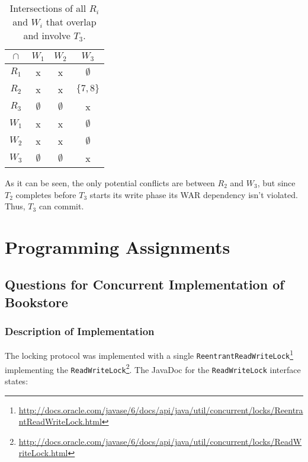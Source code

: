 \documentclass[11pt,a4paper,english]{article}
\begin{document}
\begin{table}[!hbt]
\centering
\begin{tabular}{|c|c|c|c|}
\hline
$\cap$  & $W_{1}$ & $W_{2}$ & $W_{3}$    \\ \hline
$R_{1}$ & x  & x  & $\emptyset$ \\ \hline
$R_{2}$ & x  & x  & $\{7,8\}$ \\ \hline
$R_{3}$ & $\emptyset$ & $\emptyset$ & x \\ \hline
$W_{1}$ & x  & x  & $\emptyset$ \\ \hline
$W_{2}$ & x  & x  & $\emptyset$ \\ \hline
  $W_{3}$ & $\emptyset$ & $\emptyset$ & x \\ \hline
\end{tabular}
\caption{Intersections of all $R_{i}$ and $W_{i}$ that overlap and involve $T_{3}$.}
\label{tbl:scenario3}
\end{table}

As it can be seen, the only potential conflicts are between $R_2$ and $W_3$, but
since $T_2$ completes before $T_3$ starts its write phase its WAR dependency
isn't violated. Thus, $T_3$ can commit.

\section{Programming Assignments}
\subsection{Questions for Concurrent Implementation of Bookstore}
\subsubsection{Description of Implementation}
The locking protocol was implemented with a single \texttt{ReentrantReadWriteLock}\footnote{\url{http://docs.oracle.com/javase/6/docs/api/java/util/concurrent/locks/ReentrantReadWriteLock.html}} implementing the  \texttt{ReadWriteLock}\footnote{\url{http://docs.oracle.com/javase/6/docs/api/java/util/concurrent/locks/ReadWriteLock.html}}. The JavaDoc for the \texttt{ReadWriteLock} interface  states:
\end{document}
